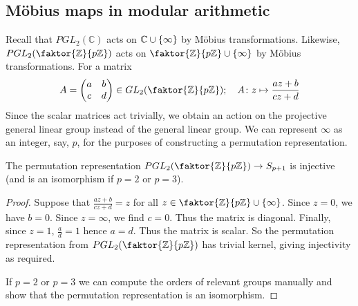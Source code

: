 \subsection{M\"obius maps in modular arithmetic}
Recall that \( PGL_2(\mathbb C) \) acts on \( \mathbb C \cup \qty{\infty} \) by M\"obius transformations.
Likewise, \( PGL_2\qty(\faktor{\mathbb Z}{p\mathbb Z}) \) acts on \( \faktor{\mathbb Z}{p\mathbb Z} \cup \qty{\infty} \) by M\"obius transformations.
For a matrix
\[ A = \begin{pmatrix}
	a & b \\
	c & d
\end{pmatrix} \in GL_2\qty(\faktor{\mathbb Z}{p\mathbb Z});\quad A \colon z \mapsto \frac{az+b}{cz+d} \]
Since the scalar matrices act trivially, we obtain an action on the projective general linear group instead of the general linear group.
We can represent \( \infty \) as an integer, say, \( p \), for the purposes of constructing a permutation representation.
\begin{lemma}
	The permutation representation \( PGL_2\qty(\faktor{\mathbb Z}{p\mathbb Z}) \to S_{p+1} \) is injective (and is an isomorphism if \( p = 2 \) or \( p = 3 \)).
\end{lemma}
\begin{proof}
	Suppose that \( \frac{az+b}{cz+d} = z \) for all \( z \in \faktor{\mathbb Z}{p\mathbb Z} \cup \qty{\infty} \).
	Since \( z = 0 \), we have \( b = 0 \).
	Since \( z = \infty \), we find \( c = 0 \).
	Thus the matrix is diagonal.
	Finally, since \( z = 1 \), \( \frac{a}{d} = 1 \) hence \( a = d \).
	Thus the matrix is scalar.
	So the permutation representation from \( PGL_2\qty(\faktor{\mathbb Z}{p \mathbb Z}) \) has trivial kernel, giving injectivity as required.

	If \( p = 2 \) or \( p = 3 \) we can compute the orders of relevant groups manually and show that the permutation representation is an isomorphism.
\end{proof}

